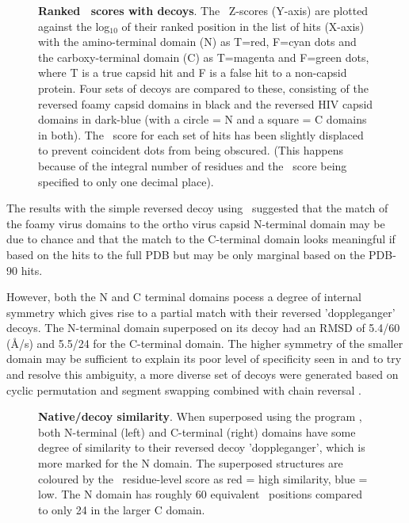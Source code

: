 \begin{figure}
\centering
{}
\begin{footnotesize}
\caption{
\label{Fig:revs}
{\bf Ranked \DALI\ scores with decoys}.
The \DALI\ Z-scores (Y-axis) are plotted against the log$_{10}$ of their ranked position in the 
list of hits (X-axis) with the amino-terminal domain (N) as T=red, F=cyan dots and the carboxy-terminal domain (C)
as T=magenta and F=green dots, where T is a true capsid hit and F is a false hit to a non-capsid protein.
Four sets of decoys are compared to these, consisting of the reversed foamy capsid domains in
black and the reversed HIV capsid domains in dark-blue (with a circle = N and a square = C domains in both).
The \DALI\ score for each set of hits has been slightly displaced to prevent coincident dots from being
obscured.  (This happens because of the integral number of residues and the \DALI\ score being specified
to only one decimal place).
}
\end{footnotesize}
\end{figure}

The results with the simple reversed decoy using \DALI\, suggested that the match of the foamy virus domains to the
ortho virus capsid N-terminal domain may be due to chance and that the match to the C-terminal domain looks 
meaningful if based on the hits to the full PDB but may be only marginal based on the PDB-90 hits. 

However, both the N and C terminal domains pocess a degree of internal symmetry which gives
rise to a partial match with their reversed 'doppleganger' decoys.   The N-terminal domain superposed on its decoy
had an RMSD of 5.4/60 (\AA/\CA s) and 5.5/24 for the C-terminal domain.   The higher symmetry of the smaller
domain may be sufficient to explain its poor level of specificity seen in  and to try and resolve this
ambiguity, a more diverse set of decoys were generated based on cyclic permutation and segment swapping combined
with chain reversal \cite{TaylorWR06a}.

\begin{figure}
\centering
{}
\begin{footnotesize}
\caption{
\label{Fig:tows}
{\bf Native/decoy similarity}.
When superposed using the program \SAP, both N-terminal (left) and C-terminal (right) domains
have some degree of similarity to their reversed decoy 'doppleganger', which is more marked
for the N domain.   The superposed structures are coloured by the \SAP\ residue-level score as
red = high similarity, blue = low.  The N domain has roughly 60 equivalent \CA\ positions
compared to only 24 in the larger C domain.
}
\end{footnotesize}
\end{figure}

